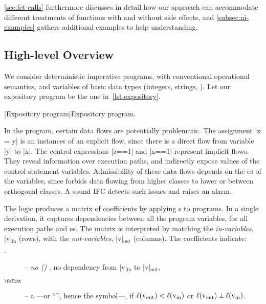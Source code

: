 \autoref{sec:fct-calls} furthermore discusses in detail how our approach can
accommodate different treatments of functions with and without side
effects, and \autoref{subsec:ni-examples} gathers additional
examples to help understanding.

\subsection{High-level Overview}
\label{sec:overview}

We consider deterministic imperative programs, with conventional operational
semantics, and variables of basic data types (integers, strings, \etc).
Let our expository program be the one in~\autoref{lst:expository}.

\begin{center}
\begin{minipage}{\textwidth}
\captionsetup{type=lstlisting}
[Expository program]{Expository program.}
\label{lst:expository}
\end{minipage}
\end{center}

In the program, certain data flows are potentially problematic. The assignment
\prc|x = y| is an instances of an explicit flow, since there is a direct flow from variable \prc|y| to \prc|x|.
The control expressions \prc|z==1| and \prc|x==1| represent implicit
flows. They reveal information over execution
paths, and indirectly expose values of the control statement variables.
Admissibility of these data flows depends on the es of the
variables, since  forbids data flowing from higher classes
to lower or between orthogonal classes. A sound IFC detects such issues and
raises an alarm.

The logic \lname produces a matrix of coefficients by applying s to programs. In a single derivation, it captures dependencies between all
the program variables, for all execution paths and es. The
matrix is interpreted by matching the \emph{in-variables},
\prc|v|\(_{\text{in}}\) (rows), with the \emph{out-variables},
\prc|v|\(_{\text{out}}\) (columns). The coefficients indicate:

\begin{description}

\item[\(\cdot\)] -- \emph{no \emph{()}
}, no dependency from \prc|v|$_\text{in}$ to
\prc|v|$_\text{out}$,

\item[\(\vi\)] -- a \emph{}---or \enquote{},
hence the symbol---, if \ensuremath{\lvl{\prc|v$_{\text{out}}$|} <
\lvl{\prc|v$_{\text{in}}$|}} or \ensuremath{\lvl{\prc|v$_{\text{out}}$|} \orth
\lvl{\prc|v$_{\text{in}}$|}}.

\end{description}

